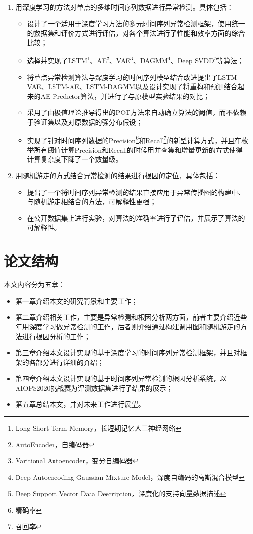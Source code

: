 \begin{enumerate}
    \item 用深度学习的方法对单点的多维时间序列数据进行异常检测。具体包括：
        \begin{itemize}
        \item 设计了一个适用于深度学习方法的多元时间序列异常检测框架，使用统一的数据集和评价方式进行评估，对各个算法进行了性能和效率方面的综合比较；
        \item 选择并实现了LSTM\footnote{Long Short-Term Memory，长短期记忆人工神经网络}、AE\footnote{AutoEncoder，自编码器}、VAE\footnote{Varitional Autoencoder，变分自编码器}\cite{an2015variational}、DAGMM\footnote{Deep Autoencoding Gaussian Mixture Model，深度自编码的高斯混合模型}\cite{zong2018deep}、Deep SVDD\footnote{Deep Support Vector Data Description，深度化的支持向量数据描述}\cite{ruff2018deep}等算法；
        \item 将单点异常检测算法与深度学习的时间序列模型结合改进提出了LSTM-VAE、LSTM-AE、LSTM-DAGMM以及设计实现了将重构和预测结合起来的AE-Predictor算法，并进行了与原模型实验结果的对比；
        \item 采用了由极值理论推导得出的POT\cite{siffer2017anomaly}方法来自动确立算法的阈值，而不依赖于验证集以及对原数据的强分布假设；
        \item 实现了针对时间序列数据的Precision\footnote{精确率}和Recall\footnote{召回率}的新型计算方式\cite{tatbul2018precision}，并且在枚举所有阈值计算Precision和Recall的时候用并查集和增量更新的方式使得计算复杂度下降了一个数量级。
        \end{itemize}
    \item 用随机游走的方式结合异常检测的结果进行根因的定位，具体包括：
        \begin{itemize}
        \item 提出了一个将时间序列异常检测的结果直接应用于异常传播图的构建中、与随机游走相结合的方法，可解释性更强；
        \item 在公开数据集上进行实验，对算法的准确率进行了评估，并展示了算法的可解释性。
        \end{itemize}
\end{enumerate}
\section{论文结构}
本文内容分为五章：
\begin{itemize}
    \item 第一章介绍本文的研究背景和主要工作；
    \item 第二章介绍相关工作，主要是异常检测和根因分析两方面，前者主要介绍近些年用深度学习做异常检测的工作，后者则介绍通过构建调用图和随机游走的方法进行根因分析的工作；
    \item 第三章介绍本文设计实现的基于深度学习的时间序列异常检测框架，并且对框架的各部分进行详细的介绍；
    \item 第四章介绍本文设计实现的基于时间序列异常检测的根因分析系统，以AIOPS2020挑战赛为评测数据集进行了结果的展示；
    \item 第五章总结本文，并对未来工作进行展望。
\end{itemize}